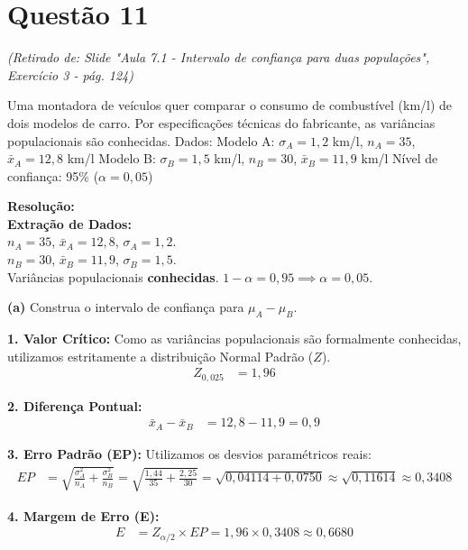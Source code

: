 \documentclass[12pt, a4paper]{article}
\begin{document}
\section*{Questão 11}
\textit{(Retirado de: Slide "Aula 7.1 - Intervalo de confiança para duas populações", Exercício 3 - pág. 124)}

Uma montadora de veículos quer comparar o consumo de combustível (km/l) de dois modelos de carro. Por especificações técnicas do fabricante, as variâncias populacionais são conhecidas. Dados:
Modelo A: $\sigma_A = 1{,}2$ km/l, $n_A = 35$, $\bar{x}_A = 12{,}8$ km/l
Modelo B: $\sigma_B = 1{,}5$ km/l, $n_B = 30$, $\bar{x}_B = 11{,}9$ km/l
Nível de confiança: 95\% ($\alpha = 0{,}05$)

\vspace{0.3cm}
\noindent\textbf{Resolução:} \\
\textbf{Extração de Dados:} \\
$n_A = 35$, $\bar{x}_A = 12{,}8$, $\sigma_A = 1{,}2$. \\
$n_B = 30$, $\bar{x}_B = 11{,}9$, $\sigma_B = 1{,}5$. \\
Variâncias populacionais \textbf{conhecidas}. $1-\alpha = 0{,}95 \implies \alpha = 0{,}05$.

\medskip\noindent\textbf{(a)} Construa o intervalo de confiança para $\mu_A - \mu_B$.

\noindent \textbf{1. Valor Crítico:}
Como as variâncias populacionais são formalmente conhecidas, utilizamos estritamente a distribuição Normal Padrão ($Z$).
\begin{align*}
Z_{0{,}025} &= \boxed{1{,}96}
\end{align*}

\noindent \textbf{2. Diferença Pontual:}
\begin{align*}
\bar{x}_A - \bar{x}_B &= 12{,}8 - 11{,}9 = \boxed{0{,}9}
\end{align*}

\noindent \textbf{3. Erro Padrão (EP):}
Utilizamos os desvios paramétricos reais:
\begin{align*}
EP &= \sqrt{\frac{\sigma_A^2}{n_A} + \frac{\sigma_B^2}{n_B}} = \sqrt{\frac{1{,}44}{35} + \frac{2{,}25}{30}} = \sqrt{0{,}04114 + 0{,}0750} \approx \sqrt{0{,}11614} \approx \boxed{0{,}3408}
\end{align*}

\noindent \textbf{4. Margem de Erro (E):}
\begin{align*}
E &= Z_{\alpha/2} \times EP = 1{,}96 \times 0{,}3408 \approx \boxed{0{,}6680}
\end{align*}
\end{document}
